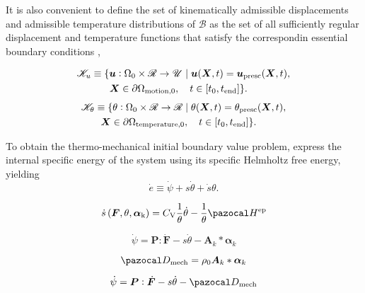 It is also convenient to define the set of kinematically admissible displacements and admissible temperature distributions of $\mathscr{B}$ as the set of all sufficiently regular displacement and temperature functions that satisfy the correspondin essential boundary conditions \citep{de2011computational},
\begin{highlight}[innertopmargin=-5pt]
    \begin{multline}
        \mathscr{K}_u\equiv \{\bm{u}:\Omega_0\times \mathscr{R}\to \mathscr{U}\;|\;\bm{u}(\bm{X},t) = \bm{u}_\text{presc} (\bm{X},t),\\ \bm{X}\in\partial \Omega_\text{motion,0},\quad t\in [t_0,t_\text{end}]\}.\quad
    \end{multline}
    \begin{multline}
        \mathscr{K}_\theta\equiv \{\theta:\Omega_0\times \mathscr{R}\to \mathscr{R}\;|\;\theta(\bm{X},t) = \theta_\text{presc} (\bm{X},t),\\ \bm{X}\in\partial \Omega_\text{temperature,0},\quad t\in [t_0,t_\text{end}]\}.\quad
    \end{multline}
\end{highlight}

To obtain the thermo-mechanical initial boundary value problem, express the internal specific energy of the system using its specific Helmholtz free energy, yielding
\begin{equation}
  \dot e \equiv \dot \psi + s\dot \theta + \dot s\theta.
\end{equation}


\begin{equation}
\dot{s}\left(\boldsymbol{F}, \theta, \bm{\alpha}_{\mathrm{k}}\right)= C_{\mathrm{V}} \frac{1}{\theta} \dot{\theta}- \frac{1}{\theta}\pazocal H^\text{ep}
\end{equation}

\begin{equation}
  \dot \psi = \bm P:\dot{\bm F} -s\dot{\theta} - \bm A_k*\bm \alpha_k
\end{equation}

\begin{equation}
  \pazocal D_\text{mech} = \rho_0\bm A_k *\bm \alpha_k
\end{equation}

\begin{highlight}
  \begin{equation}
    \dot \psi = \bm P:\dot{\bm F} - s\dot \theta - \pazocal D_\text{mech}
  \end{equation}
\end{highlight}


